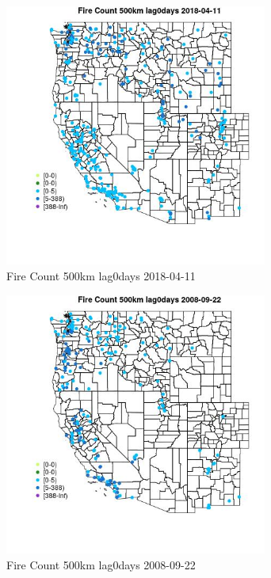 \begin{figure} 
\centering  
\includegraphics[width=0.77\textwidth]{Code_Outputs/Report_ML_input_PM25_Step4_part_e_de_duplicated_aves_compiled_2019-05-18wNAs_MapObsFire_Count_500km_lag0days2018-04-11.jpg} 
\caption{\label{fig:Report_ML_input_PM25_Step4_part_e_de_duplicated_aves_compiled_2019-05-18wNAsMapObsFire_Count_500km_lag0days2018-04-11}Fire Count 500km lag0days 2018-04-11} 
\end{figure} 
 

\clearpage 

\begin{figure} 
\centering  
\includegraphics[width=0.77\textwidth]{Code_Outputs/Report_ML_input_PM25_Step4_part_e_de_duplicated_aves_compiled_2019-05-18wNAs_MapObsFire_Count_500km_lag0days2008-09-22.jpg} 
\caption{\label{fig:Report_ML_input_PM25_Step4_part_e_de_duplicated_aves_compiled_2019-05-18wNAsMapObsFire_Count_500km_lag0days2008-09-22}Fire Count 500km lag0days 2008-09-22} 
\end{figure} 
 

